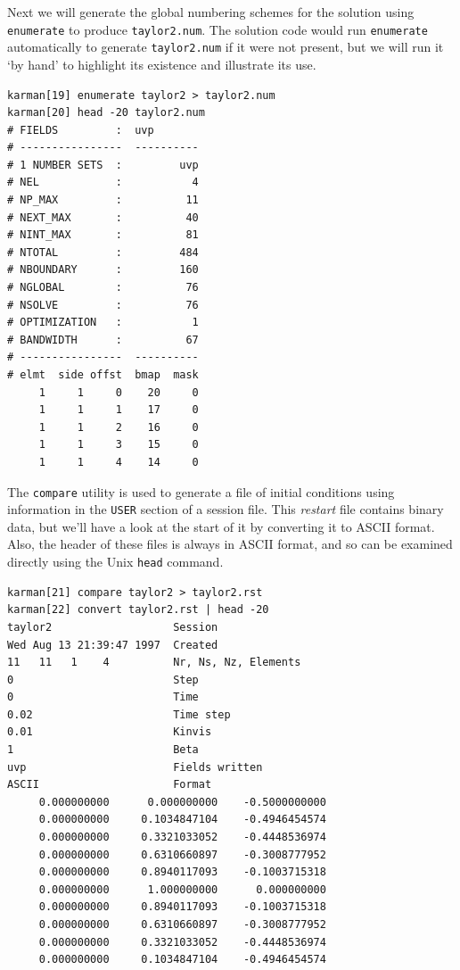 \documentclass[11pt,a4paper]{report}
\begin{document}
Next we will generate the global numbering schemes for the solution
using \texttt{enumerate} to produce \texttt{taylor2.num}.  The
solution code would run \texttt{enumerate} automatically to generate
\texttt{taylor2.num} if it were not present, but we will run it `by
hand' to highlight its existence and illustrate its use.
{\small
\begin{verbatim}
karman[19] enumerate taylor2 > taylor2.num
karman[20] head -20 taylor2.num
# FIELDS         :  uvp
# ----------------  ----------
# 1 NUMBER SETS  :         uvp
# NEL            :           4
# NP_MAX         :          11
# NEXT_MAX       :          40
# NINT_MAX       :          81
# NTOTAL         :         484
# NBOUNDARY      :         160
# NGLOBAL        :          76
# NSOLVE         :          76
# OPTIMIZATION   :           1
# BANDWIDTH      :          67
# ----------------  ----------
# elmt  side offst  bmap  mask
     1     1     0    20     0
     1     1     1    17     0
     1     1     2    16     0
     1     1     3    15     0
     1     1     4    14     0
\end{verbatim}
}

The \texttt{compare} utility is used to generate a file of initial
conditions using information in the \verb|USER| section of a session
file.  This \emph{restart} file contains binary data, but we'll have a
look at the start of it by converting it to ASCII format.  Also, the
header of these files is always in ASCII format, and so can be
examined directly using the Unix \texttt{head} command.  {\small
\begin{verbatim}
karman[21] compare taylor2 > taylor2.rst
karman[22] convert taylor2.rst | head -20
taylor2                   Session
Wed Aug 13 21:39:47 1997  Created
11   11   1    4          Nr, Ns, Nz, Elements
0                         Step
0                         Time
0.02                      Time step
0.01                      Kinvis
1                         Beta
uvp                       Fields written
ASCII                     Format
     0.000000000      0.000000000    -0.5000000000 
     0.000000000     0.1034847104    -0.4946454574 
     0.000000000     0.3321033052    -0.4448536974 
     0.000000000     0.6310660897    -0.3008777952 
     0.000000000     0.8940117093    -0.1003715318 
     0.000000000      1.000000000      0.000000000 
     0.000000000     0.8940117093    -0.1003715318 
     0.000000000     0.6310660897    -0.3008777952 
     0.000000000     0.3321033052    -0.4448536974 
     0.000000000     0.1034847104    -0.4946454574 
\end{verbatim}
}
\end{document}
